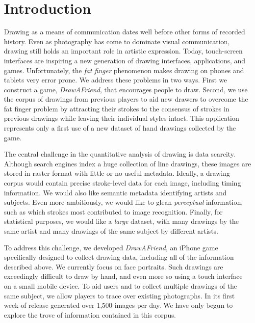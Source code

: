 \section{Introduction}

Drawing as a means of communication dates well before other forms of
recorded history. Even as photography has come to dominate visual
communication, drawing still holds an important role in artistic
expression. Today, touch-screen interfaces are inspiring a new
generation of drawing interfaces, applications, and games.
Unfortunately, the {\em fat finger} phenomenon makes drawing on
phones and tablets very error prone. We address these problems in
two ways. First we construct a game, {\em DrawAFriend}, that
encourages people to draw. Second, we use the corpus of drawings
from previous players to aid new drawers to overcome the fat finger
problem by attracting their strokes to the consensus of strokes in previous
drawings while leaving their individual styles intact. This
application represents only a first use of a new dataset of hand
drawings collected by the game.

The central challenge in the quantitative analysis of drawing is
data scarcity. Although search engines index a huge collection of line
drawings, these images are stored in raster format with little
or no useful metadata. Ideally, a drawing corpus would contain
precise stroke-level data for each image, including timing
information. We would also like semantic metadata identifying
artists and subjects. Even more ambitiously, we would like to glean
\emph{perceptual} information, such as which strokes most
contributed to image recognition. Finally, for statistical purposes,
we would like a \emph{large} dataset, with many drawings by the same
artist and many drawings of the same subject by different artists.

To address this challenge, we developed \emph{DrawAFriend}, an
iPhone game specifically designed to collect drawing data, including
all of the information described above. We currently focus on face
portraits. Such drawings are exceedingly difficult to draw by hand,
and even more so using a touch interface on a small mobile device. To aid users and to
collect multiple drawings of the same subject, we allow players to
trace over existing photographs. In its first week of release \daf
generated over 1,500 images per day. We have only begun to explore
the trove of information contained in this corpus.

